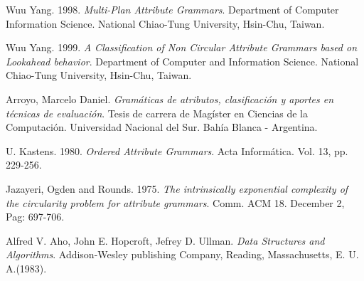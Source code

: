 \documentclass[runningheads,a4paper]{llncs}
\begin{document}

\begin{thebibliography}{10}
\vspace{-0.2cm}
 Wuu Yang. 1998. \textit{Multi-Plan Attribute Grammars}. Department of Computer Information Science. National Chiao-Tung University, Hsin-Chu, Taiwan.

 Wuu Yang. 1999. \textit{A Classification of Non Circular Attribute Grammars based on Lookahead behavior}. Department of Computer and Information Science. National Chiao-Tung University, Hsin-Chu, Taiwan.






 Arroyo, Marcelo Daniel. \textit{Gramáticas de atributos, clasificación y aportes en técnicas de evaluación}. Tesis de carrera de Magíster en Ciencias de la Computación. Universidad Nacional del Sur. Bahía Blanca - Argentina.

 U. Kastens. 1980. \textit{Ordered Attribute Grammars}. Acta Informática. Vol. 13, pp. 229-256.

 Jazayeri, Ogden and Rounds. 1975. \emph{The intrinsically exponential complexity of the circularity problem for attribute grammars}. Comm. ACM 18. December 2, Pag: 697-706.


  Alfred V. Aho, John E. Hopcroft, Jefrey D. Ullman. \textit{Data Structures and Algorithms}. Addison-Wesley publishing Company, Reading, Massachusetts, E. U. A.(1983).


\end{thebibliography}
\end{document}
